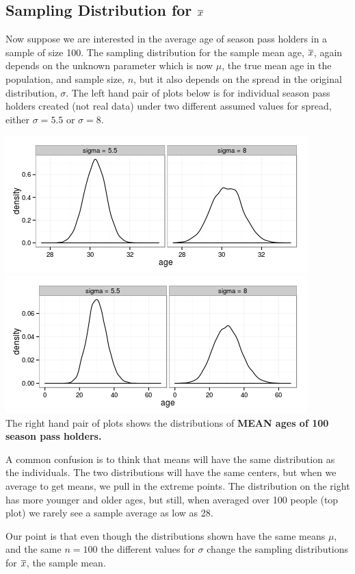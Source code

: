 \subsection{ Sampling Distribution for $\overline{x}$}

 Now suppose we are interested in the average age of season pass
 holders in a sample of size 100. The sampling distribution  for the
 sample mean age, $\overline{x}$, 
 again depends on the  unknown parameter which is now $\mu$, the true
 mean age in the population,  and sample size, $n$,
 but it also depends on the spread in the original distribution,
 $\sigma$.  
 The left hand pair of plots below is for individual season pass
 holders created (not real data) under two different assumed values
 for spread, either $\sigma = 5.5$ or $\sigma = 8$.

\includegraphics[width =.48\linewidth]{plots/twoSampDensities4xbar.png}
\hfill
\includegraphics[width =.48\linewidth]{plots/twoSampDensities4x.png}\\

 The right hand pair of plots  shows the distributions of {\bf MEAN ages of 100
   season pass holders.} 

 A common confusion is to think that means will have the same
 distribution as the individuals. The two distributions will have the
 same centers, but when we average to get means, we pull in the
 extreme points.  The distribution on the right has more younger and
 older ages, but still, when averaged over 100 people (top plot) we
 rarely see a sample average as low as 28.

 Our point is that even though the distributions shown have the same
 means $\mu$, and the same $n =  100$ the different values for
 $\sigma$ change the sampling distributions for $\overline{x}$, the sample mean. 



 

